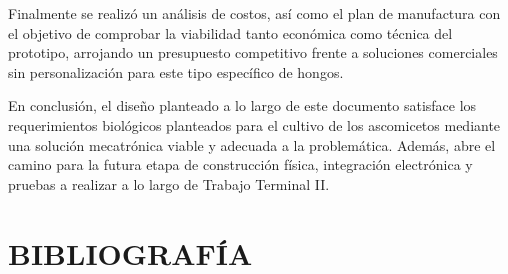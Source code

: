 \documentclass[11pt,tesis,twoside,openright,spanish]{upiiztt}
\begin{document}
Finalmente se realizó un análisis de costos, así como el plan de manufactura con
el objetivo de comprobar la viabilidad tanto económica como técnica del prototipo,
arrojando un presupuesto competitivo frente a soluciones comerciales sin
personalización para este tipo específico de hongos.

En conclusión, el diseño planteado a lo largo de este documento satisface los
requerimientos biológicos planteados para el cultivo de los ascomicetos mediante
una solución mecatrónica viable y adecuada a la problemática. Además, abre el
camino para la futura etapa de construcción física, integración electrónica y pruebas
a realizar a lo largo de Trabajo Terminal II.

\chapter*{BIBLIOGRAFÍA}
\end{document}
